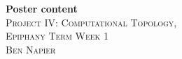 



\begin{center}
  \textbf{Poster content} \\
  \textsc{Project IV: Computational Topology, \\ Epiphany Term Week 1} \\
  \textsc{Ben Napier}
  \vspace{1em}
\end{center}





